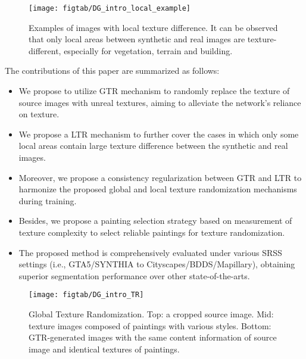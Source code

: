 \documentclass[twocolumn,journal,vlined,ruled,linesnumbered]{IEEEtran}
\begin{document}
\begin{figure*}[t]
\begin{centering}
\texttt{[image: figtab/DG\_intro\_local\_example]}
\par\end{centering}
\vspace{-2mm}
\caption{Examples of images with local texture difference. It can be observed that only local areas between synthetic and real images are texture-different, especially for vegetation, terrain and building. \label{fig:3}}
\vspace{-6mm}
\end{figure*}

The contributions of this paper are summarized as follows:
\begin{itemize}
\item We propose to utilize GTR mechanism to randomly replace the texture of source images with unreal textures, aiming to alleviate the network's reliance on texture.
\item We propose a LTR mechanism to further cover the cases in which only some local areas contain large texture difference between the synthetic and real images.
\item Moreover, we propose a consistency regularization between GTR and LTR to harmonize the proposed global and local texture randomization mechanisms during training.
\item Besides, we propose a painting selection strategy based on measurement of texture complexity to select reliable paintings for texture randomization.
\item The proposed method is comprehensively evaluated under various SRSS settings (i.e., GTA5/SYNTHIA to Cityscapes/BDDS/Mapillary), obtaining superior segmentation performance over other state-of-the-arts.
\end{itemize}

\begin{figure*}[tbh]
\begin{centering}
\texttt{[image: figtab/DG\_intro\_TR]}
\par\end{centering}
\vspace{-2mm}
\begin{centering}
\caption{Global Texture Randomization. Top: a cropped source image. Mid: texture images composed of paintings with various styles. Bottom: GTR-generated images with the same content information of source image and identical textures of paintings. \label{fig:Texture-Randomization}}
\par\end{centering}
\vspace{-2mm}
\end{figure*}
\end{document}

